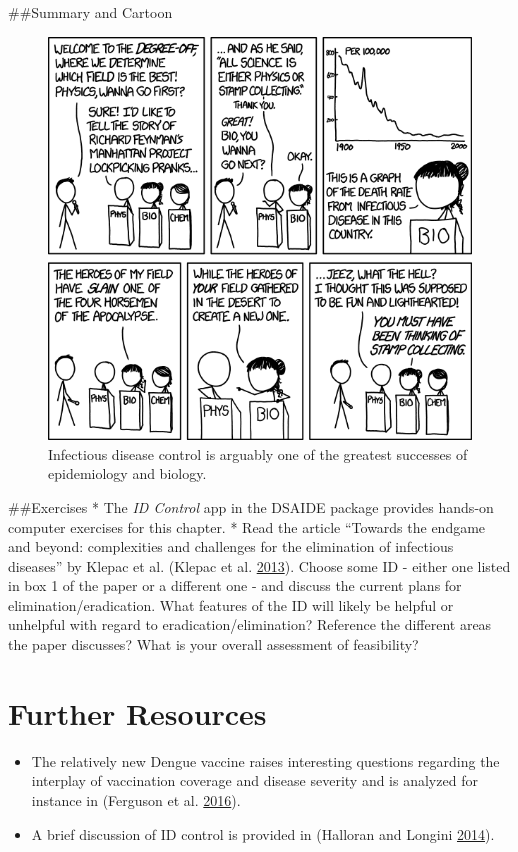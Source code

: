 \documentclass[]{book}
\providecommand{\tightlist}{%
  \setlength{\itemsep}{0pt}\setlength{\parskip}{0pt}}
\theoremstyle{definition}
\theoremstyle{definition}
\theoremstyle{definition}
\theoremstyle{remark}
\begin{document}
\#\#Summary and Cartoon

\begin{figure}
\centering
\includegraphics{./images/xkcd-disease-eradication.png}
\caption{Infectious disease control is arguably one of the greatest
successes of epidemiology and biology.}
\end{figure}

\#\#Exercises * The \emph{ID Control} app in the DSAIDE package provides
hands-on computer exercises for this chapter. * Read the article
``Towards the endgame and beyond: complexities and challenges for the
elimination of infectious diseases'' by Klepac et al. (Klepac et al.
\protect\hyperlink{ref-klepac13}{2013}). Choose some ID - either one
listed in box 1 of the paper or a different one - and discuss the
current plans for elimination/eradication. What features of the ID will
likely be helpful or unhelpful with regard to eradication/elimination?
Reference the different areas the paper discusses? What is your overall
assessment of feasibility?

\hypertarget{further-resources-2}{%
\section{Further Resources}\label{further-resources-2}}

\begin{itemize}
\tightlist
\item
  The relatively new Dengue vaccine raises interesting questions
  regarding the interplay of vaccination coverage and disease severity
  and is analyzed for instance in (Ferguson et al.
  \protect\hyperlink{ref-ferguson16}{2016}).
\item
  A brief discussion of ID control is provided in (Halloran and Longini
  \protect\hyperlink{ref-halloran14}{2014}).
\end{itemize}
\end{document}
